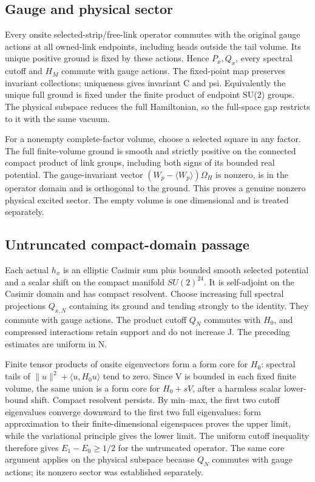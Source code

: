 \hypertarget{r29-am2-gauge-and-physical-sector}{%
\subsection{Gauge and physical sector}\label{r29:am2:r29-am2-gauge-and-physical-sector}}

Every onsite selected-strip/free-link operator commutes with the original gauge actions at all owned-link endpoints, including heads outside the tail volume. Its unique positive ground is fixed by these actions. Hence \(P_x,Q_x\), every spectral cutoff and \(H_M\) commute with gauge actions. The fixed-point map preserves invariant collections; uniqueness gives invariant C and psi. Equivalently the unique full ground is fixed under the finite product of endpoint SU(2) groups. The physical subspace reduces the full Hamiltonian, so the full-space gap restricts to it with the same vacuum.

For a nonempty complete-factor volume, choose a selected square in any factor. The full finite-volume ground is smooth and strictly positive on the connected compact product of link groups, including both signs of its bounded real potential. The gauge-invariant vector \((W_p-\langle W_p\rangle)\Omega_H\) is nonzero, is in the operator domain and is orthogonal to the ground. This proves a genuine nonzero physical excited sector. The empty volume is one dimensional and is treated separately.

\hypertarget{r29-am2-untruncated-compact-domain-passage}{%
\subsection{Untruncated compact-domain passage}\label{r29:am2:r29-am2-untruncated-compact-domain-passage}}

Each actual \(h_x\) is an elliptic Casimir sum plus bounded smooth selected potential and a scalar shift on the compact manifold \(SU(2)^{24}\). It is self-adjoint on the Casimir domain and has compact resolvent. Choose increasing full spectral projections \(Q_{x,N}\) containing its ground and tending strongly to the identity. They commute with gauge actions. The product cutoff \(Q_N\) commutes with \(H_0\), and compressed interactions retain support and do not increase J. The preceding estimates are uniform in N.

Finite tensor products of onsite eigenvectors form a form core for \(H_0\): spectral tails of \(\|u\|^2+\langle u,H_0u\rangle\) tend to zero. Since V is bounded in each fixed finite volume, the same union is a form core for \(H_0+sV\), after a harmless scalar lower-bound shift. Compact resolvent persists. By min--max, the first two cutoff eigenvalues converge downward to the first two full eigenvalues: form approximation to their finite-dimensional eigenspaces proves the upper limit, while the variational principle gives the lower limit. The uniform cutoff inequality therefore gives \(E_1-E_0\ge 1/2\) for the untruncated operator. The same core argument applies on the physical subspace because \(Q_N\) commutes with gauge actions; its nonzero sector was established separately.

